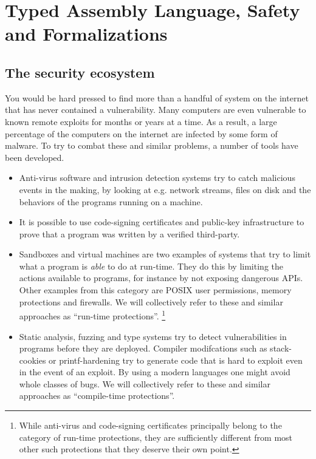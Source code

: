 \chapter{Typed Assembly Language, Safety and Formalizations}
\label{chap:introduction}

\section{The security ecosystem}
You would be hard pressed to find more than a handful of system on the internet
that has never contained a vulnerability. Many computers are even vulnerable to
known remote exploits for months or years at a time. As a result, a large
percentage of the computers on the internet are infected by some form of
malware. To try to combat these and similar problems, a number of tools have
been developed.

\begin{itemize}
\item Anti-virus software and intrusion detection systems try to catch malicious
  events in the making, by looking at e.g. network streams, files on disk and
  the behaviors of the programs running on a machine.
\item It is possible to use code-signing certificates and public-key
  infrastructure to prove that a program was written by a verified third-party.
\item Sandboxes and virtual machines are two examples of systems that try to
  limit what a program is \emph{able} to do at run-time. They do this by
  limiting the actions available to programs, for instance by not exposing
  dangerous APIs. Other examples from this category are POSIX user permissions,
  memory protections and firewalls. We will collectively refer to these and
  similar approaches as ``run-time protections''.  \footnote{ While anti-virus
    and code-signing certificates principally belong to the category of run-time
    protections, they are sufficiently different from most other such
    protections that they deserve their own point.  }
\item Static analysis, fuzzing and type systems try to detect vulnerabilities in
  programs before they are deployed. Compiler modifcations such as stack-cookies
  or printf-hardening try to generate code that is hard to exploit even in the
  event of an exploit. By using a modern languages one might avoid whole classes
  of bugs. We will collectively refer to these and similar approaches as
  ``compile-time protections''.
\end{itemize}

